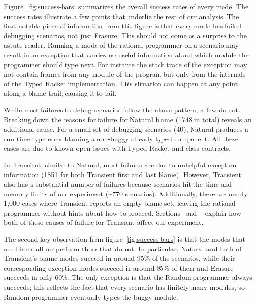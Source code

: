 Figure~\ref{fig:success-bars} summarizes the overall success rates of
every mode.  The success rates illustrate a few points that underlie the
rest of our analysis.  The first notable piece of information from this
figure is that every mode has failed debugging scenarios, not just
Erasure. This should not come as a surprise to the astute reader.  Running
a mode of the rational programmer on a scenario may result in an exception
that carries no useful information about which module the programmer
should type next. For instance the stack trace of the exception may not
contain frames from any module of the program but only from the internals
of the Typed Racket implementation. This situation can happen at any point
along a blame trail, causing it to fail.

While most failures to debug scenarios follow the above pattern, a few do
not.  Breaking down the reasons for failure for Natural blame (1748 in
total) reveals an additional cause. For a small set of debugging scenarios
(40), Natural produces a run time type error blaming a non-buggy already
typed component. All these cases are due to known open issues with Typed
Racket and class contracts. 

In Transient, similar to Natural, most failures are due to unhelpful
exception information (1851 for both Transient first and last blame).
However, Transient also has a substantial number of failures because
scenarios hit the time and memory limits of our experiment
(\textasciitilde770 scenarios).  Additionally, there are nearly 1,000
cases where Transient reports an empty blame set, leaving the rational
programmer without hints about how to proceed.
Sections~\label{sec:threat:transient} and ~\label{sec:threat:transient2}
explain how both of these causes of failure for Transient affect our
experiment. 

The second key observation from figure~\ref{fig:success-bars} is that the
modes that use blame all outperform those that do not.  In particular,
Natural and both of Transient's blame modes succeed in around 95\% of the
scenarios, while their corresponding exception modes succeed in around
85\% of them and Erasure succeeds in only 60\%.  The only
exception is that the Random programmer always succeeds; this reflects the
fact that every scenario has finitely many modules, so Random programmer 
eventually types the buggy module.


